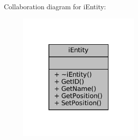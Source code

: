 Collaboration diagram for i\+Entity\+:\nopagebreak
\begin{figure}[H]
\begin{center}
\leavevmode
\includegraphics[width=172pt]{classiEntity__coll__graph}
\end{center}
\end{figure}
